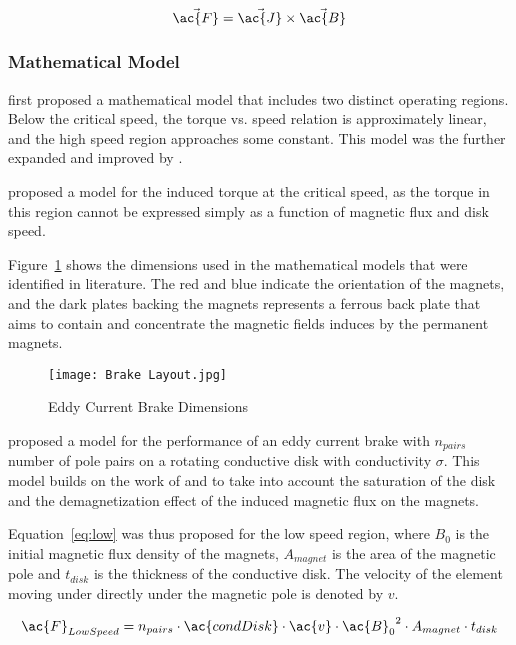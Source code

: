 \begin{equation}
	\vec{\ac{F}} = \vec{\ac{J}} \times \vec{\ac{B}}
	\label{eq:force}
\end{equation}

\subsubsection{Mathematical Model}

\citet{Smythe:1942} first proposed a mathematical model that includes two distinct operating regions. Below the critical speed, the torque vs. speed relation is approximately linear, and the high speed region approaches some constant. This model was the further expanded and improved by \cite{Smythe:1950}.

\cite{Wouterse:1991} proposed a model for the induced torque at the critical speed, as the torque in this region cannot be expressed simply as a function of magnetic flux and disk speed. 

Figure~\ref{fig:EB} shows the dimensions used in the mathematical models that were identified in literature. The red and blue indicate the orientation of the magnets, and the dark plates backing the magnets represents a ferrous back plate that aims to contain and concentrate the magnetic fields induces by the permanent magnets. \citep{Gay:2005}

\begin{figure}[H]
	\centering
	\texttt{[image: Brake Layout.jpg]}
	\caption{Eddy Current Brake Dimensions}
	\label{fig:EB}
\end{figure}

\vspace*{-0.5cm}

\cite{Baum:2016} proposed a model for the performance of an eddy current brake with $n_{pairs}$ number of pole pairs on a rotating conductive disk with conductivity $\sigma$. This model builds on the work of \cite{Smythe:1950} and \cite{Wouterse:1991} to take into account the saturation of the disk and the demagnetization effect of the induced magnetic flux on the magnets. \citep{Gay:2005}

Equation~\ref{eq:low} was thus proposed for the low speed region, where $B_0$ is the initial magnetic flux density of the magnets, $A_{magnet}$ is the area of the magnetic pole and $t_{disk}$ is the thickness of the conductive disk. The velocity of the element moving under directly under the magnetic pole is denoted by $v$.

\begin{equation}
	\ac{F}_{Low Speed} = n_{pairs} \cdot \ac{condDisk} \cdot \ac{v} \cdot {\ac{B}_0}^2 \cdot A_{magnet} \cdot t_{disk}
	\label{eq:low}
\end{equation}

